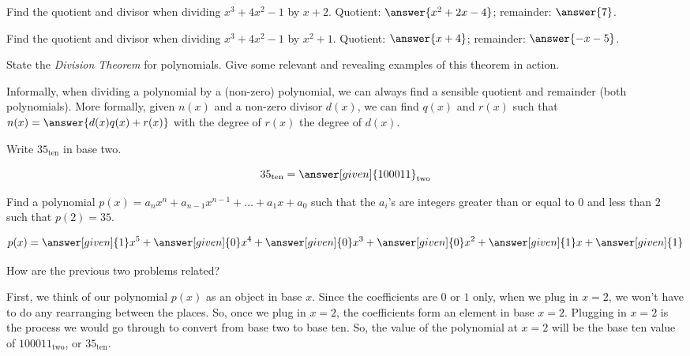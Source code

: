 \documentclass[nooutcomes]{ximera}
\begin{document}
\begin{problem}
Find the quotient and divisor when dividing $x^3+4x^2-1$ by $x+2$.  
Quotient: $\answer{x^2+2x-4}$; remainder: $\answer{7}$. 
\end{problem}

\begin{problem}
Find the quotient and divisor when dividing $x^3+4x^2-1$ by $x^2+1$.  
Quotient: $\answer{x+4}$; remainder: $\answer{-x-5}$. 
\end{problem}


\begin{problem}State the \textit{Division Theorem} for polynomials. Give some
  relevant and revealing examples of this theorem in action.
\begin{freeResponse}
\begin{hint}
Informally, when dividing a polynomial by a (non-zero) polynomial, we can always find a sensible quotient and remainder (both polynomials).  More formally, given $n(x)$ and a non-zero divisor $d(x)$, we can find $q(x)$ and $r(x)$ such that $n(x) = \answer{d(x)q(x)+r(x)}$ with the degree of $r(x)$  the degree of $d(x)$.  
\end{hint}
\end{freeResponse}
\end{problem} 



\begin{problem}
Write $35_{\text{ten}}$ in base two.
\begin{prompt}
\[
35_{\text{ten}} = \answer[given]{100011}_{\text{two}}
\]
\end{prompt}
	\begin{problem}
		Find a polynomial $p(x) = a_nx^n + a_{n-1}x^{n-1} + \dots + a_1 x + a_0$ such that the $a_i$'s are integers greater than or equal to $0$ and less than $2$ such that $p(2) = 35$.
		\begin{prompt}
			\[
			p(x) = \answer[given]{1}x^5 + \answer[given]{0}x^4 + \answer[given]{0}x^3 + \answer[given]{0}x^2 + \answer[given]{1}x + \answer[given]{1}
			\]
		\end{prompt}
		\begin{problem}
			How are the previous two problems related?
			\begin{freeResponse}
			\begin{hint}
				First, we think of our polynomial $p(x)$ as an object in base $x$.  Since the coefficients are $0$ or $1$ only, when we plug in $x=2$, we won't have to do any rearranging between the places.  So, once we plug in $x=2$, the coefficients form an element in base $x=2$.  Plugging in $x=2$ is the process we would go through to convert from base two to base ten.  So, the value of the polynomial at $x=2$ will be the base ten value of $100011_{\text{two}}$, or $35_{\text{ten}}$.
			\end{hint}
			\end{freeResponse}
		\end{problem}
	\end{problem}
\end{problem}
\end{document}
